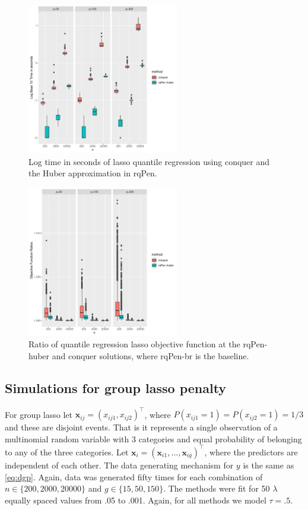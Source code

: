 \begin{figure}

{\centering \includegraphics[width=250px,height=250px]{figures/lassoSpeedCompare} 

}

\caption{Log time in seconds of lasso quantile regression using conquer and the Huber approximation in rqPen.}\label{fig:lassoSpeedCompare}
\end{figure}

\begin{figure}

{\centering \includegraphics[width=250px,height=250px]{figures/lassoObjCompare} 

}

\caption{Ratio of quantile regression lasso objective function at the rqPen-huber and conquer solutions, where rqPen-br is the baseline.}\label{fig:lassoObjCompare}
\end{figure}

\subsection{Simulations for group lasso penalty}\label{simulations-for-group-lasso-penalty}

For group lasso let \(\mathbf{x}_{ij}=(x_{ij1},x_{ij2})^\top\), where \(P(x_{ij1}=1)=P(x_{ij2}=1)=1/3\) and these are disjoint events. That is it represents a single observation of a multinomial random variable with 3 categories and equal probability of belonging to any of the three categories. Let \(\mathbf{x}_i = (\mathbf{x}_{i1},\ldots,\mathbf{x}_{ig})^\top\), where the predictors are independent of each other. The data generating mechanism for \(y\) is the same as \eqref{eq:dgp}. Again, data was generated fifty times for each combination of \(n \in \{200,2000,20000\}\) and \(g \in \{15,50,150\}\). The methods were fit for 50 \(\lambda\) equally spaced values from .05 to .001. Again, for all methods we model \(\tau=.5\).

